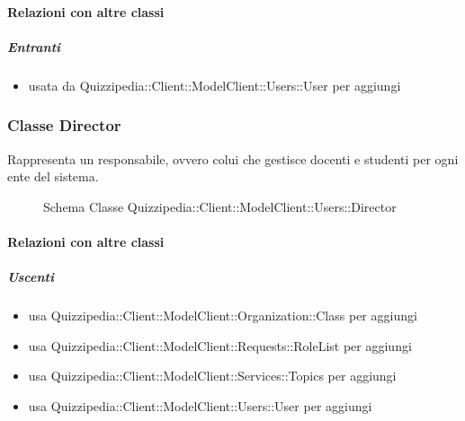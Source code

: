 \paragraph{Relazioni con altre classi}
\subparagraph{Entranti}
\begin{itemize}
\item usata da Quizzipedia::Client::ModelClient::Users::User per aggiungi
\end{itemize}
\subsubsection{Classe Director}
Rappresenta un responsabile, ovvero colui che gestisce docenti e studenti per ogni ente del sistema.
\begin{figure}[H]
\centering
\noindent{}
\caption[Schema Classe Director]{Schema Classe Quizzipedia::Client::ModelClient::Users::Director}
\end{figure}
\paragraph{Relazioni con altre classi}
\subparagraph{Uscenti}
\begin{itemize}
\item usa Quizzipedia::Client::ModelClient::Organization::Class per aggiungi
\item usa Quizzipedia::Client::ModelClient::Requests::RoleList per aggiungi
\item usa Quizzipedia::Client::ModelClient::Services::Topics per aggiungi
\item usa Quizzipedia::Client::ModelClient::Users::User per aggiungi
\end{itemize}
